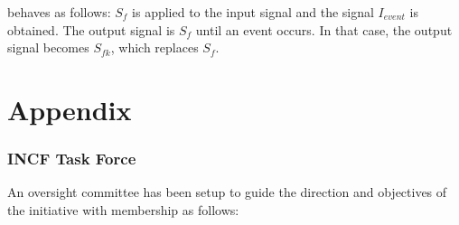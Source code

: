 \documentclass[a4paper]{article}
\begin{document}
behaves as follows: $S_{f}$ is applied to the input signal and the
signal $I_{event}$ is obtained. The output signal is $S_{f}$ until an
event occurs. In that case, the output signal becomes $S_{fk}$, which
replaces $S_{f}$.



\newpage


\appendix


\part*{Appendix}

\section{INCF Task Force}

An oversight committee has been setup to guide the direction and
objectives of the initiative with membership as follows:
\end{document}
